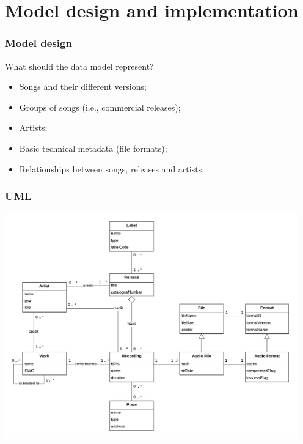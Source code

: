 \documentclass{beamer}
\begin{document}
\section{Model design and implementation}


  \begin{frame}
    \frametitle{Model design}

    What should the data model represent?

    \vspace{1em}

    \begin{itemize}
      \itemsep0.75em
      \item Songs and their different versions;
      \item Groups of songs (i.e., commercial releases);
      \item Artists;
      \item Basic technical metadata (file formats);
      \item Relationships between songs, releases and artists.
    \end{itemize}

  \end{frame}



  \begin{frame}
    \frametitle{UML}
    \begin{center}
      \includegraphics[width=0.95\textwidth]{img/UML.pdf}
    \end{center}
  \end{frame}
\end{document}
